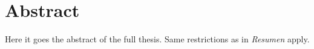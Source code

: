 \chapter*{Abstract}
Here it goes the abstract of the full thesis. Same restrictions as in \emph{Resumen} apply.
